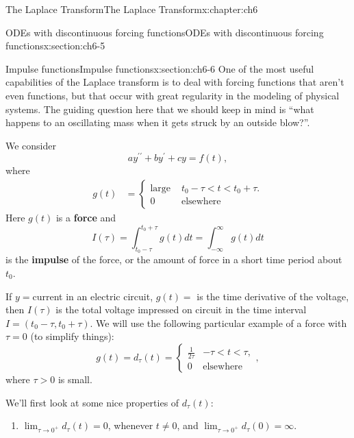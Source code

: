 \documentclass[oneside,10pt,]{book}
\newcommand{\terminology}[1]{\textbf{#1}}
\numberwithin{equation}{section}
\numberwithin{equation}{section}
\newcommand{\lt}{<}
\newcommand{\amp}{&}
\begin{document}
\begin{chapterptx}{The Laplace Transform}{}{The Laplace Transform}{}{}{x:chapter:ch6}
\begin{sectionptx}{ODEs with discontinuous forcing functions}{}{ODEs with discontinuous forcing functions}{}{}{x:section:ch6-5}
\end{sectionptx}
%
%
\typeout{************************************************}
\typeout{************************************************}
%
\begin{sectionptx}{Impulse functions}{}{Impulse functions}{}{}{x:section:ch6-6}
One of the most useful capabilities of the Laplace transform is to deal with forcing functions that aren't even functions, but that occur with great regularity in the modeling of physical systems. The guiding question here that we should keep in mind is ``what happens to an oscillating mass when it gets struck by an outside blow?''.%
\par
We consider%
\begin{equation*}
ay^{\prime\prime}+by^{\prime}+cy=f(t),
\end{equation*}
where%
\begin{align*}
g(t) \amp =\begin{cases}
\text{large } \amp t_{0}-\tau\lt t\lt t_{0}+\tau.\\
0 \amp \text{elsewhere}
\end{cases}
\end{align*}
Here \(g(t)\) is a \terminology{force} and%
\begin{equation*}
I(\tau)=\int_{t_{0}-\tau}^{t_{0}+\tau}g(t)dt=\int_{-\infty}^{\infty}g(t)dt
\end{equation*}
is the \terminology{impulse} of the force, or the amount of force in a short time period about \(t_{0}\).%
\par
If \(y=\)current in an electric circuit, \(g(t)=\) is the time derivative of the voltage, then \(I(\tau)\) is the total voltage impressed on circuit in the time interval \(I=\left(t_{0}-\tau,t_{0}+\tau\right)\). We will use the following particular example of a force with \(\tau=0\) (to simplify things):%
\begin{equation*}
g(t)=d_{\tau}(t)=\begin{cases}
\frac{1}{2\tau} \amp -\tau\lt t\lt \tau,\\
0 \amp \text{elsewhere}
\end{cases},
\end{equation*}
where \(\tau>0\) is small.%
\par
We'll first look at some nice properties of \(d_{\tau}(t)\):%
\begin{enumerate}
\item{}\({\displaystyle \lim_{\tau\to0^{+}}d_{\tau}(t)=0}\), whenever \(t\neq0\), and \(\lim_{\tau\to0^{+}}d_{\tau}(0)=\infty\). \begin{image}{0}{1}{0}%

\end{image}
\end{enumerate}
\end{sectionptx}
\end{chapterptx}
\end{document}
